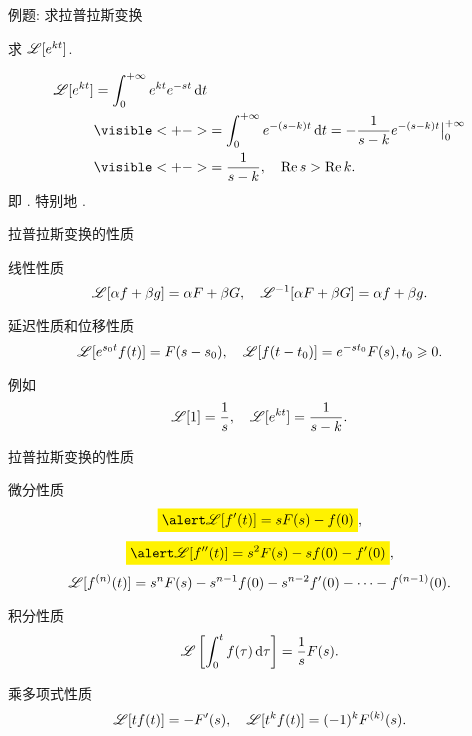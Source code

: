 \begin{frame}{例题: 求拉普拉斯变换}
\begin{example}
求 $\mathscr{L}[e^{kt}]$.
\end{example}
\begin{solution}
\vspace{-\baselineskip}
\begin{align*}
\msl[e^{kt}]&=\int_0^{+\infty}e^{kt}e^{-st}\diff t\\
&\visible<+->{=\int_0^{+\infty}e^{-(s-k)t}\diff t
=-\frac1{s-k}e^{-(s-k)t}\big|_0^{+\infty}}\\
&\visible<+->{=\frac1{s-k}, \quad\Re s>\Re k.}
\end{align*}
\onslide<+->
即 .
\onslide<+->
特别地 .
\end{solution}
\end{frame}


\begin{frame}{拉普拉斯变换的性质}
\begin{block}{线性性质}
\[\mathscr{L}[\alpha f+\beta g]=\alpha F+\beta G,\quad
\mathscr{L}^{-1}[\alpha F+\beta G]=\alpha f+\beta g.\]
\end{block}

\begin{block}{延迟性质和位移性质}
\[\mathscr{L}[e^{s_0t}f(t)]=F(s-s_0),\quad
\mathscr{L}[f(t-t_0)]=e^{-st_0}F(s), t_0\geqslant 0.\]
\end{block}

\onslide<+->
例如
\[\mathscr{L}[1]=\frac1s,\quad\mathscr{L}[e^{kt}]=\frac1{s-k}.\]
\end{frame}


\begin{frame}{拉普拉斯变换的性质}
\begin{block}{微分性质}
\vspace{-\baselineskip}
\[\aboxeq{\msl[f'(t)]=sF(s)-f(0)},\]
\[\aboxeq{\msl[f''(t)]=s^2F(s)-sf(0)-f'(0)},\]
\[\mathscr{L}[f^{(n)}(t)]=s^nF(s)-s^{n-1}f(0)-s^{n-2}f'(0)-\cdots-f^{(n-1)}(0).\]
\end{block}

\begin{block}{积分性质}
\[\mathscr{L}\left[\int_0^t f(\tau)\,\mathrm{d}\tau\right]=\frac 1s F(s).\]
\end{block}

\begin{block}{乘多项式性质}
\[\mathscr{L}[tf(t)]=-F'(s),\quad\mathscr{L}[t^kf(t)]=(-1)^kF^{(k)}(s).\]
\end{block}
\end{frame}


